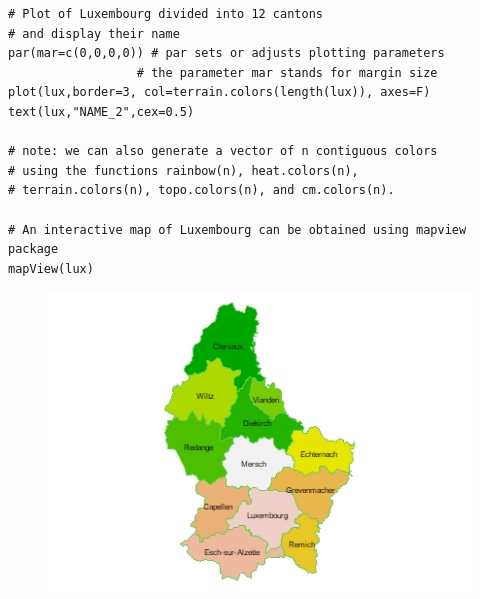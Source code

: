 \documentclass[12pt]{beamer}
\begin{document}
\begin{frame} [fragile]
\begin{tiny}
\begin{verbatim}
# Plot of Luxembourg divided into 12 cantons
# and display their name
par(mar=c(0,0,0,0)) # par sets or adjusts plotting parameters
                  # the parameter mar stands for margin size
plot(lux,border=3, col=terrain.colors(length(lux)), axes=F)
text(lux,"NAME_2",cex=0.5)

# note: we can also generate a vector of n contiguous colors
# using the functions rainbow(n), heat.colors(n),
# terrain.colors(n), topo.colors(n), and cm.colors(n).

# An interactive map of Luxembourg can be obtained using mapview package
mapView(lux)

\end{verbatim}
\end{tiny}
\vspace{-10pt}
\begin{figure}
\includegraphics[scale=0.6]{Lux_map3.jpeg}
\end{figure}
\end{frame}
\end{document}
